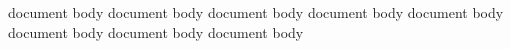 \documentclass{article}
\begin{document}
document body document body
document body document body
document body document body
document body document body
\end{document}
